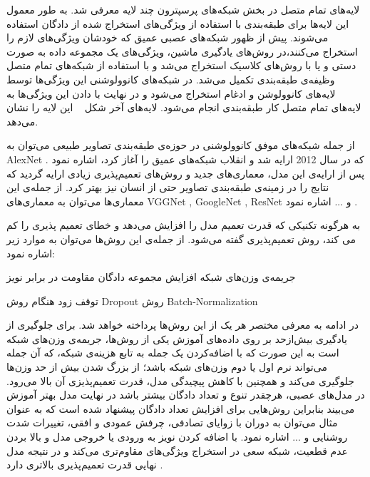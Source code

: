لایه‌های تمام متصل در بخش‌ شبکه‌های پرسپترون چند لایه معرفی شد. به طور معمول این لایه‌ها برای طبقه‌بندی با استفاده از ویژگی‌های استخراج شده از دادگان استفاده می‌شوند. پیش از ظهور شبکه‌های عصبی عمیق که خودشان ویژگی‌های لازم را استخراج می‌کنند،در روش‌های یادگیری ماشین، ویژگی‌های یک مجموعه داده به صورت دستی و یا با روش‌های کلاسیک استخراج می‌شد و با استفاده از شبکه‌های تمام متصل وظیفه‌ی طبقه‌بندی تکمیل می‌شد. در شبکه‌های کانوولوشنی این ویژگی‌ها توسط لایه‌های کانوولوشن و ادغام استخراج می‌شود و در نهایت با دادن این ویژگی‌ها به لایه‌های تمام متصل کار طبقه‌بندی انجام می‌شود. لایه‌های آخر شکل ~ این لایه را نشان می‌دهد.

از جمله شبکه‌های موفق کانوولوشنی در حوزه‌ی طبقه‌بندی تصاویر طبیعی می‌توان به AlexNet که در سال 2012 ارایه شد و انقلاب شبکه‌های عمیق را آغاز کرد، اشاره نمود . پس از ارایه‌ی این مدل، معماری‌های جدید و روش‌های تعمیم‌پذیری زیادی ارایه گردید که نتایج را در زمینه‌ی طبقه‌بندی تصاویر حتی از انسان نیز بهتر کرد. از جمله‌ی این معماری‌ها می‌توان به معماری‌های
 VGGNet ,
 GoogleNet ,
 ResNet
  و ... اشاره نمود . 
  
به هرگونه تکنیکی که قدرت تعمیم مدل را افزایش می‌دهد و خطای تعمیم پذیری را کم می کند، روش تعمیم‌پذیری گفته می‌شود. از جمله‌ی این روش‌ها می‌توان به موارد زیر اشاره نمود:
\begin{multicols}{2}
	 جریمه‌ی وزن‌های شبکه 
	 افزایش مجموعه دادگان  
	 مقاومت در برابر نویز  
	
	 توقف زود هنگام  
	 روش Dropout
	 روش Batch-Normalization
	
\end{multicols}
در ادامه به معرفی مختصر هر یک از این روش‌ها پرداخته خواهد شد.
برای جلوگیری از یادگیری بیش‌ازحد بر روی داده‌های آموزش یکی از روش‌ها، جریمه‌ی وزن‌های شبکه است به این صورت که با اضافه‌کردن یک جمله به تابع هزینه‌ی شبکه، که آن جمله می‌تواند نرم اول یا دوم وزن‌های شبکه باشد؛ از بزرگ شدن بیش از حد وزن‌ها جلوگیری می‌کند و همچنین با کاهش پیچیدگی مدل، قدرت تعمیم‌پذیزی آن بالا می‌رود.
در مدل‌های عصبی، هرچقدر تنوع و تعداد دادگان بیشتر باشد در نهایت مدل بهتر آموزش می‌بیند بنابراین روش‌هایی برای افزایش تعداد دادگان پیشنهاد شده است که به عنوان مثال می‌توان به دوران با زوایای تصادفی، چرفش عمودی و افقی، تغییرات شدت روشنایی و ... اشاره نمود.
با اضافه کردن نویز به ورودی یا خروجی مدل و بالا بردن عدم قطعیت، شبکه سعی در استخراج ویژگی‌های مقاوم‌تری می‌کند و در نتیجه مدل نهایی قدرت تعمیم‌پذیری بالاتری دارد .

